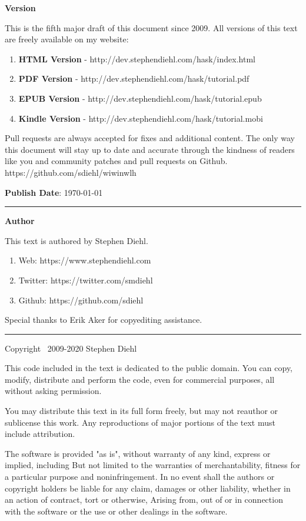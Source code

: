 \Large\textbf{Version}
\normalsize

This is the fifth major draft of this document since 2009. All versions of this
text are freely available on my website:

\begin{enumerate}
\item \textbf{HTML Version}   - http://dev.stephendiehl.com/hask/index.html
\item \textbf{PDF Version}    - http://dev.stephendiehl.com/hask/tutorial.pdf
\item \textbf{EPUB Version}   - http://dev.stephendiehl.com/hask/tutorial.epub
\item \textbf{Kindle Version} - http://dev.stephendiehl.com/hask/tutorial.mobi
\end{enumerate}

Pull requests are always accepted for fixes and additional content.  The only
way this document will stay up to date and accurate through the kindness of
readers like you and community patches and pull requests on Github.
https://github.com/sdiehl/wiwinwlh

\textbf{Publish Date}: \today \\

\par\noindent\rule{\textwidth}{0.4pt}

\Large\textbf{Author}
\normalsize

This text is authored by Stephen Diehl.

\begin{enumerate}
\item Web: https://www.stephendiehl.com
\item Twitter: https://twitter.com/smdiehl
\item Github: https://github.com/sdiehl
\end{enumerate}

Special thanks to Erik Aker for copyediting assistance.

\par\noindent\rule{\textwidth}{0.4pt}

Copyright \textcopyright \ 2009-2020 Stephen Diehl

This code included in the text is dedicated to the public domain.  You can copy,
modify, distribute and perform the code, even for commercial purposes, all
without asking permission.

You may distribute this text in its full form freely, but may not reauthor or
sublicense this work. Any reproductions of major portions of the text must
include attribution.

The software is provided "as is", without warranty of any kind, express or
implied, including But not limited to the warranties of merchantability, fitness
for a particular purpose and noninfringement. In no event shall the authors or
copyright holders be liable for any claim, damages or other liability, whether
in an action of contract, tort or otherwise, Arising from, out of or in
connection with the software or the use or other dealings in the software.

